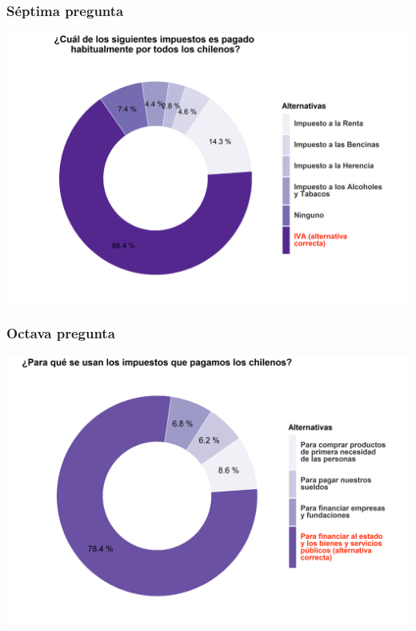 \documentclass[
  14pt,
]{book}
\begin{document}
\hypertarget{suxe9ptima-pregunta}{%
\subsubsection{Séptima pregunta}\label{suxe9ptima-pregunta}}

\begin{center}\includegraphics[width=52.49in]{images/ccivico_7} \end{center}

\hypertarget{octava-pregunta}{%
\subsubsection{Octava pregunta}\label{octava-pregunta}}

\begin{center}\includegraphics[width=52.49in]{images/ccivico_8} \end{center}
\end{document}
